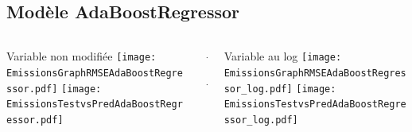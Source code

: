 \documentclass[8pt,aspectratio=169,hyperref={unicode=true}]{beamer}
\begin{document}
\subsection{Modèle AdaBoostRegressor}
\begin{frame}{\insertsubsection}
  \begin{columns}[t]
    \begin{column}{.33\textwidth}
      \centering Variable non modifiée
      \texttt{[image: EmissionsGraphRMSEAdaBoostRegressor.pdf]}
      \texttt{[image: EmissionsTestvsPredAdaBoostRegressor.pdf]}
    \end{column}
    \begin{column}{.33\textwidth}
      $\Longleftarrow$
      \scriptsize
      {\centering
        }
      

      \normalsize
      $\Longleftarrow$

      \raggedleft{$\Longrightarrow$}
      \scriptsize
      {\centering
        }
      

      \normalsize
      \raggedleft{$\Longrightarrow$}
    \end{column}
    \begin{column}{.33\textwidth}
      \centering Variable au log
      \texttt{[image: EmissionsGraphRMSEAdaBoostRegressor\_log.pdf]}
      \texttt{[image: EmissionsTestvsPredAdaBoostRegressor\_log.pdf]}
    \end{column}
  \end{columns}
\end{frame}
\end{document}
